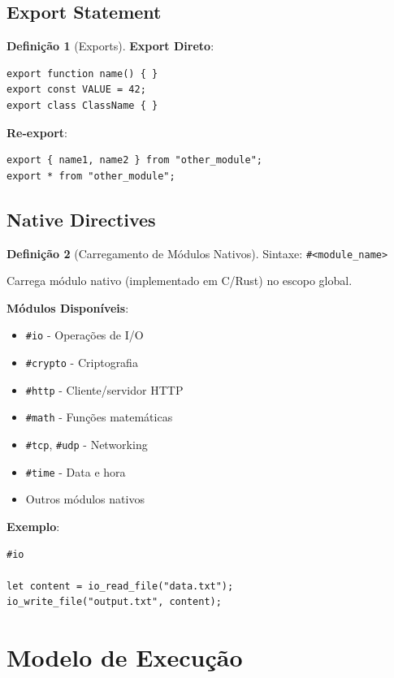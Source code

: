 \documentclass[12pt,a4paper]{article}
\theoremstyle{definition}
\newtheorem{definition}{Definição}[section]
\begin{document}
\subsection{Export Statement}

\begin{definition}[Exports]
\textbf{Export Direto}:
\begin{verbatim}
export function name() { }
export const VALUE = 42;
export class ClassName { }
\end{verbatim}

\textbf{Re-export}:
\begin{verbatim}
export { name1, name2 } from "other_module";
export * from "other_module";
\end{verbatim}
\end{definition}

\subsection{Native Directives}

\begin{definition}[Carregamento de Módulos Nativos]
Sintaxe: \texttt{\#<module\_name>}

Carrega módulo nativo (implementado em C/Rust) no escopo global.

\textbf{Módulos Disponíveis}:
\begin{itemize}[noitemsep]
    \item \texttt{\#io} - Operações de I/O
    \item \texttt{\#crypto} - Criptografia
    \item \texttt{\#http} - Cliente/servidor HTTP
    \item \texttt{\#math} - Funções matemáticas
    \item \texttt{\#tcp}, \texttt{\#udp} - Networking
    \item \texttt{\#time} - Data e hora
    \item Outros módulos nativos
\end{itemize}

\textbf{Exemplo}:
\begin{verbatim}
#io

let content = io_read_file("data.txt");
io_write_file("output.txt", content);
\end{verbatim}
\end{definition}

\section{Modelo de Execução}
\end{document}
